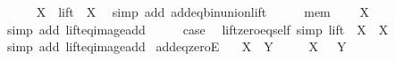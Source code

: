 \begin{isabellebody}
\ \ \isamarkupfalse%
\ {\isachardoublequoteopen}{}\ {\isacharplus}{\kern0pt}\ X\ {\isacharequal}{\kern0pt}\ lift\ {}\ X{\isachardoublequoteclose}\ \isamarkupfalse%
\ {\isacharparenleft}{\kern0pt}simp\ add{\isacharcolon}{\kern0pt}\ add{\isacharunderscore}{\kern0pt}eq{\isacharunderscore}{\kern0pt}bin{\isacharunderscore}{\kern0pt}union{\isacharunderscore}{\kern0pt}lift{\isacharparenright}{\kern0pt}\isanewline
\ \ \isamarkupfalse%
\ \isamarkupfalse%
\ mem\ \isamarkupfalse%
\ {\isachardoublequoteopen}{\isachardot}{\kern0pt}{\isachardot}{\kern0pt}{\isachardot}{\kern0pt}\ {\isacharequal}{\kern0pt}\ X{\isachardoublequoteclose}\ \isamarkupfalse%
\ {\isacharparenleft}{\kern0pt}simp\ add{\isacharcolon}{\kern0pt}\ lift{\isacharunderscore}{\kern0pt}eq{\isacharunderscore}{\kern0pt}image{\isacharunderscore}{\kern0pt}add{\isacharparenright}{\kern0pt}\isanewline
\ \ \isamarkupfalse%
\ \isamarkupfalse%
\ {\isacharquery}{\kern0pt}case\ \isacommand{{\isachardot}{\kern0pt}}\isamarkupfalse%
\isanewline
{}\isamarkupfalse%
%
\endisatagproof
{\isafoldproof}%
%
\isadelimproof
\isanewline
%
\endisadelimproof
\isanewline
{}\isamarkupfalse%
\ lift{\isacharunderscore}{\kern0pt}zero{\isacharunderscore}{\kern0pt}eq{\isacharunderscore}{\kern0pt}self\ {\isacharbrackleft}{\kern0pt}simp{\isacharbrackright}{\kern0pt}{\isacharcolon}{\kern0pt}\ {\isachardoublequoteopen}lift\ {}\ X\ {\isacharequal}{\kern0pt}\ X{\isachardoublequoteclose}\isanewline
%
\isadelimproof
\ \ %
\endisadelimproof
%
\isatagproof
{}\isamarkupfalse%
\ {\isacharparenleft}{\kern0pt}simp\ add{\isacharcolon}{\kern0pt}\ lift{\isacharunderscore}{\kern0pt}eq{\isacharunderscore}{\kern0pt}image{\isacharunderscore}{\kern0pt}add{\isacharparenright}{\kern0pt}%
\endisatagproof
{\isafoldproof}%
%
\isadelimproof
\isanewline
%
\endisadelimproof
\isanewline
{}\isamarkupfalse%
\ add{\isacharunderscore}{\kern0pt}eq{\isacharunderscore}{\kern0pt}zeroE{\isacharcolon}{\kern0pt}\isanewline
\ \ \ {\isachardoublequoteopen}X\ {\isacharplus}{\kern0pt}\ Y\ {\isacharequal}{\kern0pt}\ {}{\isachardoublequoteclose}\isanewline
\ \ \ {\isachardoublequoteopen}X\ {\isacharequal}{\kern0pt}\ {}{\isachardoublequoteclose}\ {\isachardoublequoteopen}Y\ {\isacharequal}{\kern0pt}\ {}{\isachardoublequoteclose}\isanewline
%
\isadelimproof
\ \ %
\endisadelimproof

\end{isabellebody}
